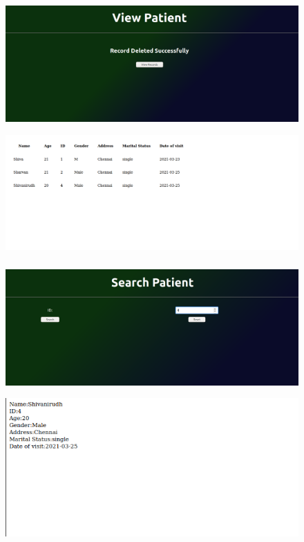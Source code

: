 \documentclass[12pt,letterpaper]{article}
\begin{document}
\subsubsection*{}
\begin{figure}[h]
    \centering
    \includegraphics[width = \textwidth]{Pics/view1.png}
\end{figure}
\begin{figure}[h!]
    \centering
    \includegraphics[width = \textwidth]{Pics/view2.png}
\end{figure}
\newpage
\subsubsection*{}
\begin{figure}[h]
    \centering
    \includegraphics[width = \textwidth]{Pics/search1.png}
\end{figure}
\begin{figure}[h!]
    \centering
    \includegraphics[width = \textwidth]{Pics/search2.png}
\end{figure}
\end{document}
